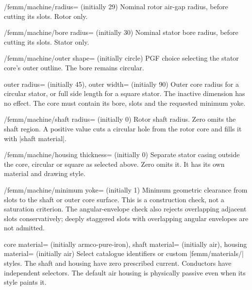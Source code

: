 \begin{key}{/femm/machine/radius= (initially 29)}
Nominal rotor air-gap radius, before cutting its slots. Rotor only.
\end{key}
\begin{key}{/femm/machine/bore radius= (initially 30)}
Nominal stator bore radius, before cutting its slots. Stator only.
\end{key}
\begin{key}{/femm/machine/outer shape= (initially circle)}
PGF choice selecting the stator core's outer outline. The bore remains circular.
\end{key}
\begin{keylist}{outer radius= (initially 45),
  outer width= (initially 90)}
Outer core radius for a circular stator, or full side length for a square
stator. The inactive dimension has no effect. The core must contain its bore,
slots and the requested minimum yoke.
\end{keylist}
\begin{key}{/femm/machine/shaft radius= (initially 0)}
Rotor shaft radius. Zero omits the shaft region. A positive value cuts a
circular hole from the rotor core and fills it with |shaft material|.
\end{key}
\begin{key}{/femm/machine/housing thickness= (initially 0)}
Separate stator casing outside the core, circular or square as selected above.
Zero omits it. It has its own material and drawing style.
\end{key}
\begin{key}{/femm/machine/minimum yoke= (initially 1)}
Minimum geometric clearance from slots to the shaft or outer core surface.
This is a construction check, not a saturation criterion. The angular-envelope
check also rejects overlapping adjacent slots conservatively; deeply staggered
slots with overlapping angular envelopes are not admitted.
\end{key}
\begin{keylist}{core material= (initially armco-pure-iron),
 shaft material= (initially air),
 housing material= (initially air)}
Select catalogue identifiers or custom |femm/materials/| styles. The shaft and
housing have zero prescribed current. Conductors have independent selectors.
The default air housing is physically passive even when its style paints it.
\end{keylist}
